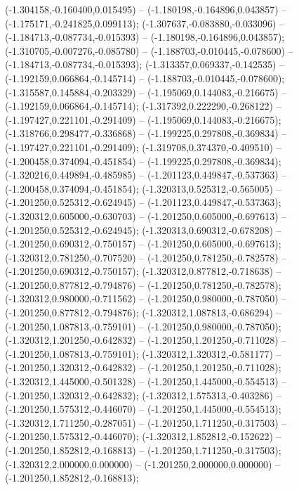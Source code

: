  (-1.304158,-0.160400,0.015495) -- (-1.180198,-0.164896,0.043857) -- (-1.175171,-0.241825,0.099113);
 (-1.307637,-0.083880,-0.033096) -- (-1.184713,-0.087734,-0.015393) -- (-1.180198,-0.164896,0.043857);
 (-1.310705,-0.007276,-0.085780) -- (-1.188703,-0.010445,-0.078600) -- (-1.184713,-0.087734,-0.015393);
 (-1.313357,0.069337,-0.142535) -- (-1.192159,0.066864,-0.145714) -- (-1.188703,-0.010445,-0.078600);
 (-1.315587,0.145884,-0.203329) -- (-1.195069,0.144083,-0.216675) -- (-1.192159,0.066864,-0.145714);
 (-1.317392,0.222290,-0.268122) -- (-1.197427,0.221101,-0.291409) -- (-1.195069,0.144083,-0.216675);
 (-1.318766,0.298477,-0.336868) -- (-1.199225,0.297808,-0.369834) -- (-1.197427,0.221101,-0.291409);
 (-1.319708,0.374370,-0.409510) -- (-1.200458,0.374094,-0.451854) -- (-1.199225,0.297808,-0.369834);
 (-1.320216,0.449894,-0.485985) -- (-1.201123,0.449847,-0.537363) -- (-1.200458,0.374094,-0.451854);
 (-1.320313,0.525312,-0.565005) -- (-1.201250,0.525312,-0.624945) -- (-1.201123,0.449847,-0.537363);
 (-1.320312,0.605000,-0.630703) -- (-1.201250,0.605000,-0.697613) -- (-1.201250,0.525312,-0.624945);
 (-1.320313,0.690312,-0.678208) -- (-1.201250,0.690312,-0.750157) -- (-1.201250,0.605000,-0.697613);
 (-1.320312,0.781250,-0.707520) -- (-1.201250,0.781250,-0.782578) -- (-1.201250,0.690312,-0.750157);
 (-1.320312,0.877812,-0.718638) -- (-1.201250,0.877812,-0.794876) -- (-1.201250,0.781250,-0.782578);
 (-1.320312,0.980000,-0.711562) -- (-1.201250,0.980000,-0.787050) -- (-1.201250,0.877812,-0.794876);
 (-1.320312,1.087813,-0.686294) -- (-1.201250,1.087813,-0.759101) -- (-1.201250,0.980000,-0.787050);
 (-1.320312,1.201250,-0.642832) -- (-1.201250,1.201250,-0.711028) -- (-1.201250,1.087813,-0.759101);
 (-1.320312,1.320312,-0.581177) -- (-1.201250,1.320312,-0.642832) -- (-1.201250,1.201250,-0.711028);
 (-1.320312,1.445000,-0.501328) -- (-1.201250,1.445000,-0.554513) -- (-1.201250,1.320312,-0.642832);
 (-1.320312,1.575313,-0.403286) -- (-1.201250,1.575312,-0.446070) -- (-1.201250,1.445000,-0.554513);
 (-1.320312,1.711250,-0.287051) -- (-1.201250,1.711250,-0.317503) -- (-1.201250,1.575312,-0.446070);
 (-1.320312,1.852812,-0.152622) -- (-1.201250,1.852812,-0.168813) -- (-1.201250,1.711250,-0.317503);
 (-1.320312,2.000000,0.000000) -- (-1.201250,2.000000,0.000000) -- (-1.201250,1.852812,-0.168813);
